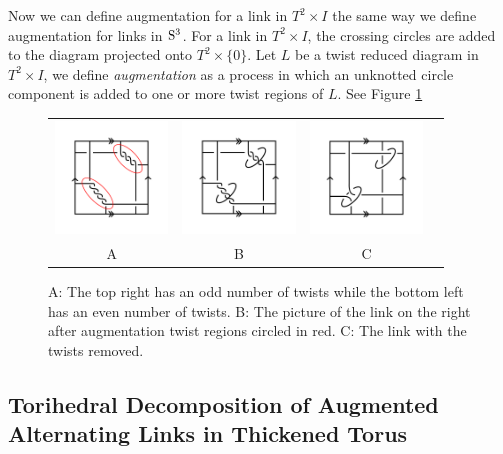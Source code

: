 \documentclass[11pt]{amsart}
\newcommand{\Sp}{{\rm{S}}}
\theoremstyle{plain}
\theoremstyle{definition}
\begin{document}
Now we can define augmentation for a link in $T^2 \times I$ the same way we define augmentation for links in $\Sp^3$. For a link in $T^2 \times I$, the crossing circles are added to the diagram projected onto $T^2 \times \{0\}$. Let $L$ be a twist reduced diagram in $T^2 \times I$, we define {\it augmentation} as a process in which an unknotted circle component is added to one or more twist regions of $L$. See Figure \ref{fig:Augmentations}


 \begin{figure}
 \centering
 \begin{tabular}{cccc}
 \includegraphics [width=3cm]{fig1}&
 \includegraphics  [width=3cm]{twist-augment}&
  \includegraphics [width=3cm]{fig-2}\\
  A&B&C
  \end{tabular}
 \caption{A: The top right has an odd number of twists while the bottom left has an even number of twists. B: The picture of the link on the right after augmentation twist regions circled in red. C: The link with the twists removed.}
 \label{fig:Augmentations}
 \end{figure}

\subsection{Torihedral Decomposition of Augmented Alternating Links in Thickened Torus}
\end{document}
